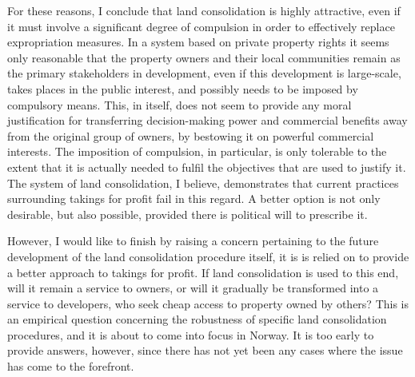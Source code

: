 For these reasons, I conclude that land consolidation is highly attractive, even if it must involve a significant degree of compulsion in order to effectively replace expropriation measures. In a system based on private property rights it seems only reasonable that the property owners and their local communities remain as the primary stakeholders in development, even if this development is large-scale, takes places in the public interest, and possibly needs to be imposed by compulsory means. This, in itself, does not seem to provide any moral justification for transferring decision-making power and commercial benefits away from the original group of owners, by bestowing it on powerful commercial interests. The imposition of compulsion, in particular, is only tolerable to the extent that it is actually needed to fulfil the objectives that are used to justify it. The system of land consolidation, I believe, demonstrates that current practices surrounding takings for profit fail in this regard. A better option is not only desirable, but also possible, provided there is political will to prescribe it. 


However, I would like to finish by raising a concern pertaining to the future development of the land consolidation procedure itself, it is is relied on to provide a better approach to takings for profit. If land consolidation is used to this end, will it remain a service to owners, or will it gradually be transformed into a service to developers, who seek cheap access to property owned by others? This is an empirical question concerning the robustness of specific land consolidation procedures, and it is about to come into focus in Norway. It is too early to provide answers, however, since there has not yet been any cases where the issue has come to the forefront. 

